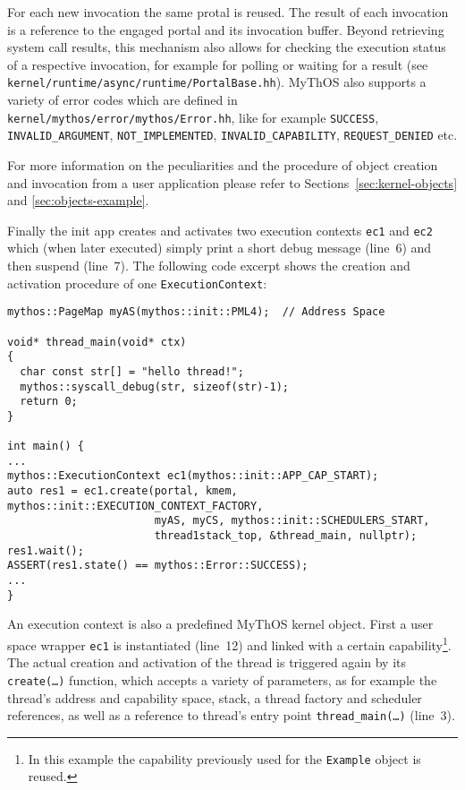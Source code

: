\noindent For each new invocation the same protal is reused. The result of each
invocation is a reference to the engaged portal and its invocation buffer.
Beyond retrieving system call results, this mechanism also allows for checking
the execution status of a respective invocation, for example for polling or
waiting for a result (see \texttt{kernel/runtime/async/runtime/PortalBase.hh}).
MyThOS also supports a variety of error codes which are defined in
\texttt{kernel/mythos/error/mythos/Error.hh}, like for example \texttt{SUCCESS},
\texttt{INVALID\_ARGUMENT}, \texttt{NOT\_IMPLEMENTED},
\texttt{INVALID\_CAPABILITY}, \texttt{REQUEST\_DENIED} etc.

For more information on the peculiarities
and the procedure of object creation and invocation from a user application
please refer to Sections~\ref{sec:kernel-objects} and \ref{sec:objects-example}.

Finally the init app creates and activates two execution contexts \texttt{ec1}
and \texttt{ec2} which (when later executed) simply print a short debug message
(line~6) and then suspend (line~7). The following code excerpt shows the
creation and activation procedure of one \texttt{ExecutionContext}:

\lstset{language=c++}
\begin{lstlisting}
mythos::PageMap myAS(mythos::init::PML4);  // Address Space

void* thread_main(void* ctx)
{
  char const str[] = "hello thread!";
  mythos::syscall_debug(str, sizeof(str)-1);
  return 0;
}

int main() {
...
mythos::ExecutionContext ec1(mythos::init::APP_CAP_START);
auto res1 = ec1.create(portal, kmem, mythos::init::EXECUTION_CONTEXT_FACTORY,
                       myAS, myCS, mythos::init::SCHEDULERS_START,
                       thread1stack_top, &thread_main, nullptr);
res1.wait();
ASSERT(res1.state() == mythos::Error::SUCCESS);
...
}
\end{lstlisting}

An execution context is also a predefined MyThOS kernel object.
First a user space wrapper \texttt{ec1} is instantiated (line~12) and linked
with a certain capability\footnote{In this example the capability previously
used for the \texttt{Example} object is reused.}.
The actual creation and activation of the thread is triggered again by its
\texttt{create(\ldots)} function, which accepts a variety of parameters, as for
example the thread's address and capability space, stack, a thread factory and
scheduler references, as well as a reference to thread's entry point
\texttt{thread\_main(\ldots)} (line~3).

